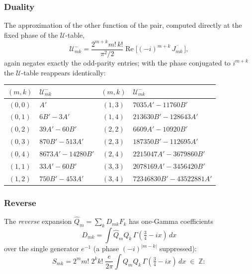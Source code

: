 \documentclass[11pt,a4paper]{article}
\theoremstyle{definition}
\newcommand{\Z}{\mathbb{Z}}
\newcommand{\G}{\Gamma}
\begin{document}
\subsubsection*{Duality}

The approximation of the other function of the pair, computed
directly at the fixed phase of the $\mathcal U$-table,
\[
  \mathcal U^-_{mk} = \frac{2^{m+k} m!\, k!}{\pi^2/2}
  \operatorname{Re}\bigl[(-i)^{m+k}\, \overline{J_{mk}}\,\bigr],
\]
again negates exactly the odd-parity entries; with the phase
conjugated to $i^{m+k}$ the $\mathcal U$-table reappears identically:

\begin{tcolorbox}[colback=black!5, colframe=black!5, boxrule=0pt, sharp corners]
\begin{center}
\small
\begin{tabular}{cl@{\qquad}cl}
\toprule
$(m,k)$ & $\mathcal U^-_{mk}$ & $(m,k)$ & $\mathcal U^-_{mk}$ \\
\midrule
$(0,0)$ & $A'$                    & $(1,3)$ & $7035 A' - 11760 B'$ \\
$(0,1)$ & $6B' - 3A'$             & $(1,4)$ & $213630 B' - 128643 A'$ \\
$(0,2)$ & $39A' - 60B'$           & $(2,2)$ & $6609 A' - 10920 B'$ \\
$(0,3)$ & $870B' - 513A'$         & $(2,3)$ & $187350 B' - 112695 A'$ \\
$(0,4)$ & $8673A' - 14280B'$      & $(2,4)$ & $2215047 A' - 3679860 B'$ \\
$(1,1)$ & $33 A' - 60 B'$         & $(3,3)$ & $2078169 A' - 3456420 B'$ \\
$(1,2)$ & $750 B' - 453 A'$       & $(3,4)$ & $72346830 B' - 43522881 A'$ \\
\bottomrule
\end{tabular}
\end{center}
\end{tcolorbox}

\subsubsection*{Reverse}

The \emph{reverse} expansion $\widehat Q_m = \sum_k D_{mk} F_k$ has
one-Gamma coefficients
\[
  D_{mk} = \int \widehat Q_m \widehat Q_k\, \G(\tfrac34 - ix)\, dx
\]
over the single generator $e^{-1}$ (a phase $(-i)^{|m-k|}$
suppressed):
\[
  S_{mk} = 2^m m!\; 2^k k!\; \frac{e}{2\pi}
  \int Q_m Q_k\, \G(\tfrac34-ix)\, dx \;\in\; \Z :
\]
\end{document}
